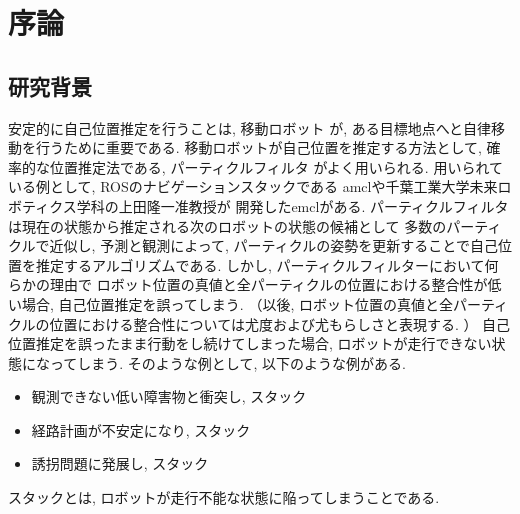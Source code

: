 \chapter{序論}

\section{研究背景}

安定的に自己位置推定を行うことは, 移動ロボット
が, ある目標地点へと自律移動を行うために重要である. 
移動ロボットが自己位置を推定する方法として,
確率的な位置推定法である, パーティクルフィルタ\cite{mcl}
がよく用いられる. 
用いられている例として, ROSのナビゲーションスタックである
amcl\cite{amcl}や千葉工業大学未来ロボティクス学科の上田隆一准教授が
開発したemcl\cite{emcl}がある. 
パーティクルフィルタは現在の状態から推定される次のロボットの状態の候補として
多数のパーティクルで近似し, 予測と観測によって,
パーティクルの姿勢を更新することで自己位置を推定するアルゴリズムである.
しかし, パーティクルフィルターにおいて何らかの理由で
ロボット位置の真値と全パーティクルの位置における整合性が低い場合, 
自己位置推定を誤ってしまう. 
（以後, ロボット位置の真値と全パーティクルの位置における整合性については尤度および尤もらしさと表現する. ）
自己位置推定を誤ったまま行動をし続けてしまった場合, 
ロボットが走行できない状態になってしまう. 
そのような例として, 以下のような例がある. 

\begin{itemize}
  \item 観測できない低い障害物と衝突し, スタック
  \item 経路計画が不安定になり, スタック
  \item 誘拐問題\cite{ueda2004iros}に発展し, スタック
\end{itemize}

\noindent
スタックとは, ロボットが走行不能な状態に陥ってしまうことである. 

